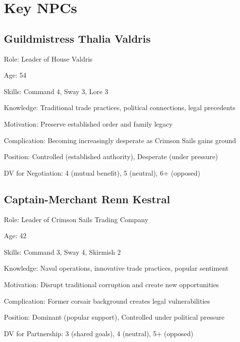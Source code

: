 \documentclass[11pt]{article}
\newenvironment{npc}[1]{\begin{description}[leftmargin=*,style=standard]\item[\textbf{#1}]}{\end{description}}
\begin{document}
\section{Key NPCs}

\subsection{Guildmistress Thalia Valdris}
\begin{npc}{Guildmistress Thalia Valdris}
\item[Role:] Leader of House Valdris
\item[Age:] 54
\item[Skills:] Command 4, Sway 3, Lore 3
\item[Knowledge:] Traditional trade practices, political connections, legal precedents
\item[Motivation:] Preserve established order and family legacy
\item[Complication:] Becoming increasingly desperate as Crimson Sails gains ground
\item[Position:] Controlled (established authority), Desperate (under pressure)
\item[DV for Negotiation:] 4 (mutual benefit), 5 (neutral), 6+ (opposed)
\end{npc}

\subsection{Captain-Merchant Renn Kestral}
\begin{npc}{Captain-Merchant Renn Kestral}
\item[Role:] Leader of Crimson Sails Trading Company
\item[Age:] 42
\item[Skills:] Command 3, Sway 4, Skirmish 2
\item[Knowledge:] Naval operations, innovative trade practices, popular sentiment
\item[Motivation:] Disrupt traditional corruption and create new opportunities
\item[Complication:] Former corsair background creates legal vulnerabilities
\item[Position:] Dominant (popular support), Controlled under political pressure
\item[DV for Partnership:] 3 (shared goals), 4 (neutral), 5+ (opposed)
\end{npc}
\end{document}
